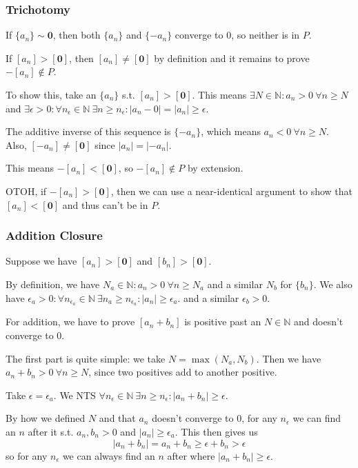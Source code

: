 \documentclass[12pt]{article}
\newcommand{\N}{\mathbb{N}}
\begin{document}
\subsubsection{Trichotomy}

If $\{a_n\} \sim \mathbf{0}$, then both $\{a_n\}$ and $\{-a_n\}$ converge to $0$,
so neither is in $P$.

If $[a_n] > [\mathbf{0}]$, then $[a_n] \ne [\mathbf{0}]$ by definition and it remains to prove $- [a_n] \notin P$.

To show this, take an $\{a_n\}$ s.t. $[a_n] > [\mathbf{0}]$.
This means $\exists N \in \N: a_n > 0\ \forall n \ge N$
and $\exists \epsilon > 0: \forall n_\epsilon \in \N\ \exists n \ge n_\epsilon: |a_n-0| = |a_n| \ge \epsilon$.

The additive inverse of this sequence is $\{-a_n\}$, which means $a_n < 0\ \forall n \ge N$.
Also, $[-a_n] \ne [\mathbf{0}]$ since $|a_n|=|-a_n|$.

This means $-[a_n] < [\mathbf{0}]$, so $-[a_n] \notin P$ by extension.

OTOH, if $-[a_n] > [\mathbf{0}]$, then we can use a near-identical argument to show
that $[a_n] < [\mathbf{0}]$ and thus can't be in $P$.

\pagebreak

\subsubsection{Addition Closure}

Suppose we have $[a_n] > [\mathbf{0}]$ and $[b_n] > [\mathbf{0}]$.

By definition, we have $N_a \in \N: a_n > 0\ \forall n \ge N_a$ and a similar $N_b$ for $\{b_n\}$.
We also have $\epsilon_a > 0: \forall n_{\epsilon_a} \in \N\ \exists n_a \ge n_{\epsilon_a}: |a_n| \ge \epsilon_a$.
and a similar $\epsilon_b > 0$.

For addition, we have to prove $[a_n+b_n]$ is positive past an $N \in \N$ and doesn't converge to $0$.

The first part is quite simple: we take $N=\max(N_a, N_b)$.
Then we have $a_n+b_n > 0\ \forall n \ge N$, since two positives add to another positive.

Take $\epsilon = \epsilon_a$.
We NTS $\forall n_\epsilon \in \N\ \exists n \ge n_\epsilon: |a_n+b_n| \ge \epsilon$.

By how we defined $N$ and that $a_n$ doesn't converge to $0$,
for any $n_\epsilon$ we can find an $n$ after it s.t. $a_n, b_n > 0$ and $|a_n| \ge \epsilon_a$.
This then gives us
\[|a_n+b_n|=a_n+b_n \ge \epsilon + b_n > \epsilon\]
so for any $n_\epsilon$ we can always find an $n$ after where $|a_n+b_n| \ge \epsilon$.
\end{document}
